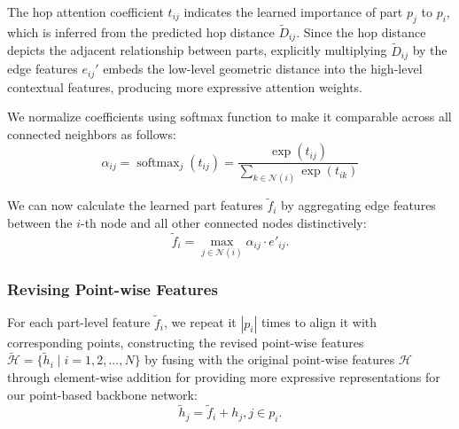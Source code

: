 \documentclass[letterpaper]{article}
\begin{document}
The hop attention coefficient \(t_{i j}\) indicates the learned importance of part \(p_j\) to \(p_i\), which is inferred from the predicted hop distance \(\tilde{D}_{ij}\).
Since the hop distance depicts the adjacent relationship between parts, explicitly multiplying \(\tilde{D}_{ij}\) by the edge features \(e_{ij}'\) embeds the low-level geometric distance into the high-level contextual features, producing more expressive attention weights.

We normalize coefficients using softmax function to make it comparable across all connected neighbors as follows:
\begin{equation}
\alpha_{i j}=\operatorname{softmax}_j\left(t_{i j}\right)=\frac{\exp \left(t_{i j}\right)}{\sum_{k \in \mathcal{N}(i)} \exp \left(t_{i k}\right)}
\end{equation}

We can now calculate the learned part features \(\tilde{f}_i\) by aggregating edge features between the \(i\)-th node and all other connected nodes distinctively:
\begin{equation}
\tilde{f}_i = \max  _{j \in \mathcal{N}(i)} \alpha_{ij} \cdot e'_{ij}.
\end{equation}

\subsubsection{Revising Point-wise Features}

For each part-level feature \(\tilde{f}_i\), we repeat it \(|p_i|\) times to align it with corresponding points, constructing the revised point-wise features \( \tilde{\mathcal{H}} = \{\tilde{h}_i \mid i=1,2,...,N \}\) by fusing with the original point-wise features \(\mathcal{H}\) through element-wise addition for providing more expressive representations for our point-based backbone network:
\begin{equation}
\tilde{h}_j = \tilde{f}_i + h_j , j \in p_i.
\end{equation}
\end{document}
